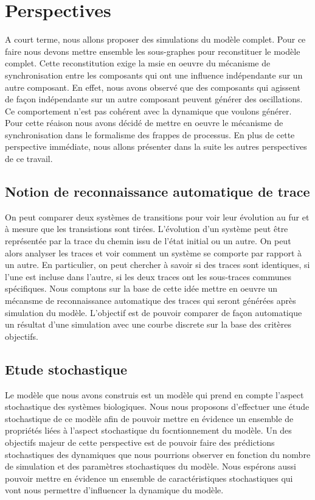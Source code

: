 \chapter{Perspectives}

A court terme, nous allons proposer des simulations du modèle complet. Pour ce faire nous devons mettre ensemble les sous-graphes pour reconstituer le modèle
complet. Cette reconstitution exige la msie en oeuvre du mécanisme de synchronisation entre les composants qui ont une influence indépendante sur un autre 
composant. En effet, nous avons observé que des composants qui agissent de façon indépendante sur un autre composant peuvent générer des oscillations. Ce comportement
n'est pas cohérent avec la dynamique que voulons générer. Pour cette réaison nous avons décidé de mettre en oeuvre le mécanisme de synchronisation dans le formalisme 
des frappes de processus. En plus de cette perspective immédiate, nous allons présenter dans la suite les autres perspectives de ce travail.

\section{Notion de reconnaissance automatique  de trace}\label{sec:trace}
On peut comparer deux systèmes de transitions pour voir leur évolution au fur et à mesure que les transistions sont tirées. L'évolution d'un système peut être 
représentée par la trace du chemin issu de l'état initial ou un autre. On peut alors analyser les traces et voir comment un système se comporte par rapport à un autre.
En particulier, on peut chercher à savoir si des traces sont identiques, si l'une est incluse dans l'autre, si les deux traces ont les sous-traces communes spécifiques.
Nous comptons sur la base de cette idée mettre en oeuvre un mécansme de reconnaissance automatique des traces qui seront générées après simulation du modèle. L'objectif est
de pouvoir comparer de façon automatique un résultat d'une simulation avec une courbe discrete sur la base des critères objectifs.


\section{Etude stochastique}\label{sec:verification}

Le modèle que nous avons construis est un modèle qui prend en compte l'aspect stochastique des systèmes biologiques. Nous nous proposons d'effectuer une étude stochastique de 
ce modèle afin de pouvoir mettre en évidence un ensemble de propriétés liées à l'aspect stochastique du focntionnement du modèle. Un des objectifs majeur de cette perspective est 
de pouvoir faire des prédictions stochastiques des dynamiques que nous pourrions observer en fonction du nombre de simulation et des paramètres stochastiques du modèle. Nous 
espérons aussi pouvoir mettre en évidence un ensemble de caractéristiques stochastiques qui vont nous permettre d'influencer la dynamique du modèle.

